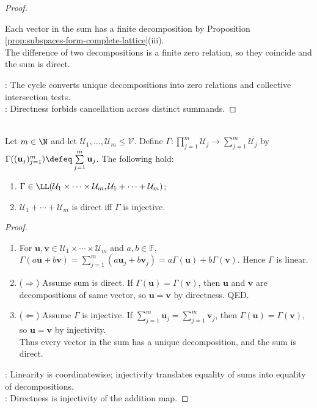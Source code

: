 \begin{proposition}
\begin{proof}
\begin{enumerate}[label=(\roman*)]
Each vector in the sum has a finite decomposition by Proposition \ref{prop:subspaces-form-complete-lattice}(iii).\\
The difference of two decompositions is a finite zero relation, so they coincide and the sum is direct.
\end{enumerate}
: The cycle converts unique decompositions into zero relations and collective intersection tests.\\
: Directness forbids cancellation across distinct summands.
\end{proof}
\end{proposition}

\begin{proposition} \label{prop:direct-sum-map-injective} \\
Let $m\in\N$ and let $\mathcal{U}_1,\ldots,\mathcal{U}_m\leq\mathcal{V}$. Define $\Gamma:\prod\limits_{j=1}^{m}\mathcal{U}_j\to\sum\limits_{j=1}^{m}\mathcal{U}_j$ by $\Gamma((\mathbf{u}_j)_{j=1}^{m})\defeq\sum\limits_{j=1}^{m}\mathbf{u}_j$. The following hold:
\begin{enumerate}[label=(\roman*)]
\setlength{\itemsep}{0pt}
\item $\Gamma\in\LL(\mathcal{U}_1\times\cdots\times\mathcal{U}_m,\mathcal{U}_1+\cdots+\mathcal{U}_m)$;
\item $\mathcal{U}_1+\cdots+\mathcal{U}_m$ is direct iff $\Gamma$ is injective.
\end{enumerate}
\begin{proof}
\begin{enumerate}[label=(\roman*)]
\setlength{\itemsep}{0pt}
\item[$(i)$] For $\mathbf{u},\mathbf{v}\in\mathcal{U}_1\times\cdots\times\mathcal{U}_m$ and $a,b\in\mathbb{F}$, $\Gamma(a\mathbf{u}+b\mathbf{v})=\sum\limits_{j=1}^{m}(a\mathbf{u}_j+b\mathbf{v}_j)=a\Gamma(\mathbf{u})+b\Gamma(\mathbf{v})$. Hence $\Gamma$ is linear.
\item[$(ii)$] ($\Rightarrow$) Assume  sum is direct. If $\Gamma(\mathbf{u})=\Gamma(\mathbf{v})$, then $\mathbf{u}$ and $\mathbf{v}$ are decompositions of same vector, so $\mathbf{u}=\mathbf{v}$ by directness. QED.
\item[$(ii)$] ($\Leftarrow$) Assume $\Gamma$ is injective. If $\sum\limits_{j=1}^{m}\mathbf{u}_j=\sum\limits_{j=1}^{m}\mathbf{v}_j$, then $\Gamma(\mathbf{u})=\Gamma(\mathbf{v})$, so $\mathbf{u}=\mathbf{v}$ by injectivity.\\
Thus every vector in the sum has a unique decomposition, and the sum is direct.
\end{enumerate}
: Linearity is coordinatewise; injectivity translates equality of sums into equality of decompositions.\\
: Directness is injectivity of the addition map.
\end{proof}
\end{proposition}

